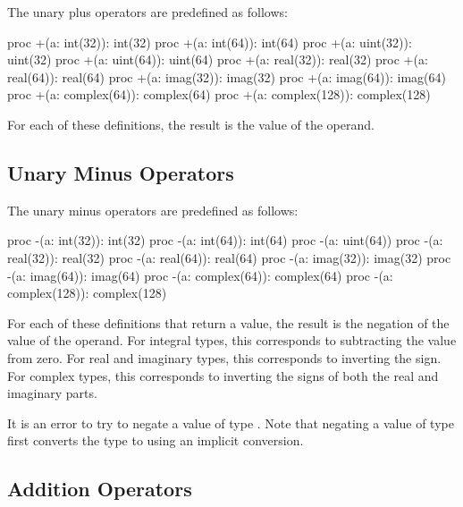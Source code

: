 The unary plus operators are predefined as follows:
\begin{chapel}
proc +(a: int(32)): int(32)
proc +(a: int(64)): int(64)
proc +(a: uint(32)): uint(32)
proc +(a: uint(64)): uint(64)
proc +(a: real(32)): real(32)
proc +(a: real(64)): real(64)
proc +(a: imag(32)): imag(32)
proc +(a: imag(64)): imag(64)
proc +(a: complex(64)): complex(64)
proc +(a: complex(128)): complex(128)
\end{chapel}
For each of these definitions, the result is the value of the operand.

\subsection{Unary Minus Operators}
\label{Unary_Minus_Operators}

The unary minus operators are predefined as follows:
\begin{chapel}
proc -(a: int(32)): int(32)
proc -(a: int(64)): int(64)
proc -(a: uint(64))
proc -(a: real(32)): real(32)
proc -(a: real(64)): real(64)
proc -(a: imag(32)): imag(32)
proc -(a: imag(64)): imag(64)
proc -(a: complex(64)): complex(64)
proc -(a: complex(128)): complex(128)
\end{chapel}
For each of these definitions that return a value, the result is the
negation of the value of the operand.  For integral types, this
corresponds to subtracting the value from zero.  For real and
imaginary types, this corresponds to inverting the sign.  For complex
types, this corresponds to inverting the signs of both the real and
imaginary parts.

It is an error to try to negate a value of type .  Note
that negating a value of type  first converts the type
to  using an implicit conversion.

\subsection{Addition Operators}
\label{Addition_Operators}

